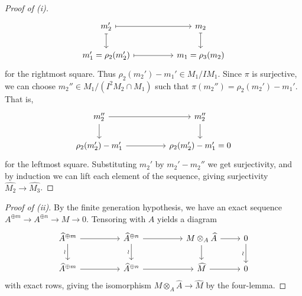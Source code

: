 \begin{proof}[Proof of (i)]
$$    \begin{tikzcd}
        {m_{2}'} && {m_{2}} \\
        {m_{1}'=\rho_{2}(m_{2}')} && {m_{1}=\rho_{3}(m_{2})}
        \arrow[maps to, from=1-1, to=1-3]
        \arrow[maps to, from=1-1, to=2-1]
        \arrow[maps to, from=1-3, to=2-3]
        \arrow[maps to, from=2-1, to=2-3]
    \end{tikzcd}$$
    for the rightmost square. Thus $\rho_{2}(m_{2}')-m_{1}'\in M_{1}/IM_{1}$. Since $\pi$ is surjective, we can choose $m_{2}''\in M_{1}/(I^{2}M_{2}\cap M_{1})$ such that $\pi(m_{2}'')=\rho_{2}(m_{2}')-m_{1}'$. That is, 
    $$%
    \begin{tikzcd}
        {m_{2}''} && {m_{2}''} \\
        {\rho_{2}(m_{2}')-m_{1}'} && {\rho_{2}(m_{2}')-m_{1}'=0}
        \arrow[from=1-1, to=1-3]
        \arrow[from=1-1, to=2-1]
        \arrow[from=1-3, to=2-3]
        \arrow[from=2-1, to=2-3]
    \end{tikzcd}$$
    for the leftmost square. Substituting $m_{2}'$ by $m_{2}'-m_{2}''$ we get surjectivity, and by induction we can lift each element of the sequence, giving surjectivity $\widehat{M_{2}}\to\widehat{M_{3}}$. 
\end{proof}
\begin{proof}[Proof of (ii)]
    By the finite generation hypothesis, we have an exact sequence $A^{\oplus m}\to A^{\oplus n}\to M\to0$. Tensoring with $A$ yields a diagram 
    $$%
    \begin{tikzcd}
        {\widehat{A}^{\oplus m}} && {\widehat{A}^{\oplus n}} && {M\otimes_{A}\widehat{A}} & 0 \\
        {\widehat{A}^{\oplus m}} && {\widehat{A}^{\oplus n}} && {\widehat{M}} & 0
        \arrow[from=1-1, to=1-3]
        \arrow["\wr"', from=1-1, to=2-1]
        \arrow[from=1-3, to=1-5]
        \arrow["\wr"', from=1-3, to=2-3]
        \arrow[from=1-5, to=1-6]
        \arrow[from=1-5, to=2-5]
        \arrow["\wr"', from=1-6, to=2-6]
        \arrow[from=2-1, to=2-3]
        \arrow[from=2-3, to=2-5]
        \arrow[from=2-5, to=2-6]
    \end{tikzcd}$$
    with exact rows, giving the isomorphism $M\otimes_{A}\widehat{A}\to\widehat{M}$ by the four-lemma. 
\end{proof}
